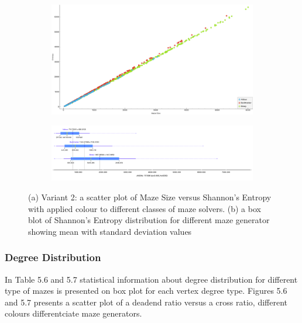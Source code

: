         \begin{figure}[!h]
            \centering
            \begin{subfigure}{0.4\textwidth}
               \includegraphics[scale = 0.15]{entropyvssize_variant2.png}
               \caption{}
            \end{subfigure}
            \begin{subfigure}{0.5\textwidth}
               \includegraphics[width=1\linewidth]{entropy_variant2.png}
               \caption{}
            \end{subfigure}
            \caption{(a) Variant 2:  a scatter plot of Maze Size versus Shannon's Entropy with applied colour to different classes of maze solvers.
            (b) a box blot of Shannon's Entropy distribution for different maze generator showing mean with standard deviation values}
            \end{figure}
\newpage
\subsubsection{Degree Distribution}  
In Table 5.6 and 5.7 statistical information about degree distribution for different type of mazes is presented on box plot for each vertex degree type.
Figures 5.6 and 5.7 presents a scatter plot of a deadend ratio versus a cross ratio, different colours differentciate maze generators.

